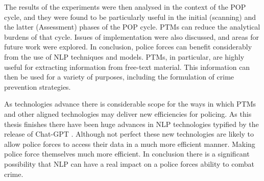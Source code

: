 The results of the experiments were then analysed in the context of the POP cycle, and they were found to be particularly useful in the initial (scanning) and the latter (Assessment) phases of the POP cycle. PTMs can reduce the analytical burdens of that cycle. Issues of implementation were also discussed, and areas for future work were explored. In conclusion, police forces can benefit considerably from the use of NLP techniques and models. PTMs, in particular, are highly useful for extracting information from free-text material. This information can then be used for a variety of purposes, including the formulation of crime prevention strategies.

As technologies advance there is considerable scope for the ways in which PTMs and other aligned technologies may deliver new efficiencies for policing. As this thesis finishes there have been huge advances in NLP technologies typified by the release of Chat-GPT \parencite{vallance_2022}. Although not perfect these new technologies are likely to allow police forces to access their data in a much more efficient manner. Making police force themselves much more efficient. In conclusion there is a significant possibility that NLP can have a real impact on a police forces ability to combat crime.





